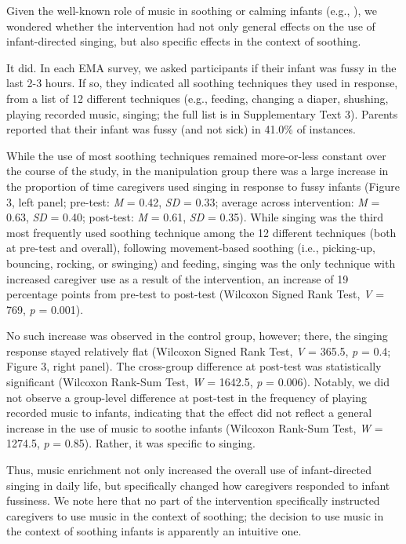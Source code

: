 \documentclass[
]{article}
\begin{document}
Given the well-known role of music in soothing or calming infants (e.g.,
), we wondered
whether the intervention had not only general effects on the use of
infant-directed singing, but also specific effects in the context of
soothing.

It did. In each EMA survey, we asked participants if their infant was
fussy in the last 2-3 hours. If so, they indicated all soothing
techniques they used in response, from a list of 12 different techniques
(e.g., feeding, changing a diaper, shushing, playing recorded music,
singing; the full list is in Supplementary Text 3). Parents reported
that their infant was fussy (and not sick) in 41.0\% of instances.

While the use of most soothing techniques remained more-or-less constant
over the course of the study, in the manipulation group there was a
large increase in the proportion of time caregivers used singing in
response to fussy infants (Figure 3, left panel; pre-test: \emph{M} =
0.42, \emph{SD} = 0.33; average across intervention: \emph{M} = 0.63,
\emph{SD} = 0.40; post-test: \emph{M} = 0.61, \emph{SD} = 0.35). While
singing was the third most frequently used soothing technique among the
12 different techniques (both at pre-test and overall), following
movement-based soothing (i.e., picking-up, bouncing, rocking, or
swinging) and feeding, singing was the only technique with increased
caregiver use as a result of the intervention, an increase of 19
percentage points from pre-test to post-test (Wilcoxon Signed Rank Test,
\emph{V} = 769, \emph{p} = 0.001).

No such increase was observed in the control group, however; there, the
singing response stayed relatively flat (Wilcoxon Signed Rank Test,
\emph{V} = 365.5, \emph{p} = 0.4; Figure 3, right panel). The
cross-group difference at post-test was statistically significant
(Wilcoxon Rank-Sum Test, \emph{W} = 1642.5, \emph{p} = 0.006). Notably,
we did not observe a group-level difference at post-test in the
frequency of playing recorded music to infants, indicating that the
effect did not reflect a general increase in the use of music to soothe
infants (Wilcoxon Rank-Sum Test, \emph{W} = 1274.5, \emph{p} = 0.85).
Rather, it was specific to singing.

Thus, music enrichment not only increased the overall use of
infant-directed singing in daily life, but specifically changed how
caregivers responded to infant fussiness. We note here that no part of
the intervention specifically instructed caregivers to use music in the
context of soothing; the decision to use music in the context of
soothing infants is apparently an intuitive one.
\end{document}
